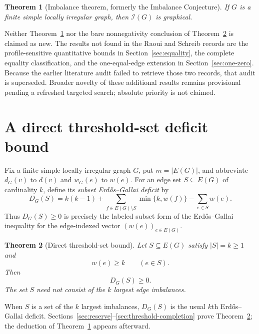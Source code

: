 \documentclass[a4paper,11pt]{amsart}
\numberwithin{equation}{section}
\newtheorem{theorem}{Theorem}[section]
\theoremstyle{definition}
\theoremstyle{remark}
\newcommand{\Ical}{\mathcal I}
\begin{document}
\begin{theorem}[Imbalance theorem, formerly the Imbalance Conjecture]\label{thm:main}
If $G$ is a finite simple locally irregular graph, then $\Ical(G)$ is graphical.
\end{theorem}

Neither Theorem~\ref{thm:main} nor the bare nonnegativity conclusion of Theorem~\ref{thm:threshold} is claimed as new.  The results not found in the Raoui and Schreib records are the profile-sensitive quantitative bounds in Section~\ref{sec:equality}, the complete equality classification, and the one-equal-edge extension in Section~\ref{sec:one-zero}.  Because the earlier literature audit failed to retrieve those two records, that audit is superseded.  Broader novelty of these additional results remains provisional pending a refreshed targeted search; absolute priority is not claimed.

\section{A direct threshold-set deficit bound}

Fix a finite simple locally irregular graph $G$, put $m=\lvert E(G)\rvert$, and abbreviate $d_G(v)$ to $d(v)$ and $w_G(e)$ to $w(e)$.  For an edge set $S\subseteq E(G)$ of cardinality $k$, define its \emph{subset Erd\H{o}s--Gallai deficit} by
\begin{equation}
D_G(S)
=k(k-1)+\sum_{f\in E(G)\setminus S}\min\{k,w(f)\}
       -\sum_{e\in S}w(e).
\label{eq:def-D}
\end{equation}
Thus $D_G(S)\ge0$ is precisely the labeled subset form of the Erd\H{o}s--Gallai inequality for the edge-indexed vector $(w(e))_{e\in E(G)}$.

\begin{theorem}[Direct threshold-set bound]\label{thm:threshold}
Let $S\subseteq E(G)$ satisfy $\lvert S\rvert=k\ge1$ and
\begin{equation}
w(e)\ge k\qquad(e\in S).
\label{eq:threshold-hyp}
\end{equation}
Then
\[
D_G(S)\ge0.
\]
The set $S$ need not consist of the $k$ largest edge imbalances.
\end{theorem}

When $S$ is a set of the $k$ largest imbalances, $D_G(S)$ is the usual $k$th Erd\H{o}s--Gallai deficit.  Sections~\ref{sec:reserve}--\ref{sec:threshold-completion} prove Theorem~\ref{thm:threshold}; the deduction of Theorem~\ref{thm:main} appears afterward.
\end{document}
